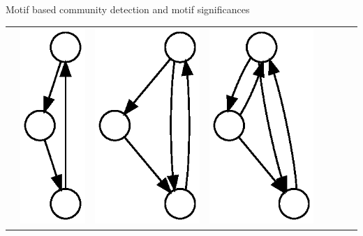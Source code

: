 \documentclass[unknownkeysallowed]{beamer}
\begin{document}
\begin{frame}{Motif based community detection and motif significances}
  \centering
  \begin{tabular}{l|lllllll}
    \hline\noalign{\smallskip}
    &
    \includegraphics[height=0.10\textheight]{M1-plain} &
    \includegraphics[height=0.10\textheight]{M2-plain} &
    \includegraphics[height=0.10\textheight]{M3-plain} &

\end{tabular}
\end{frame}
\end{document}
